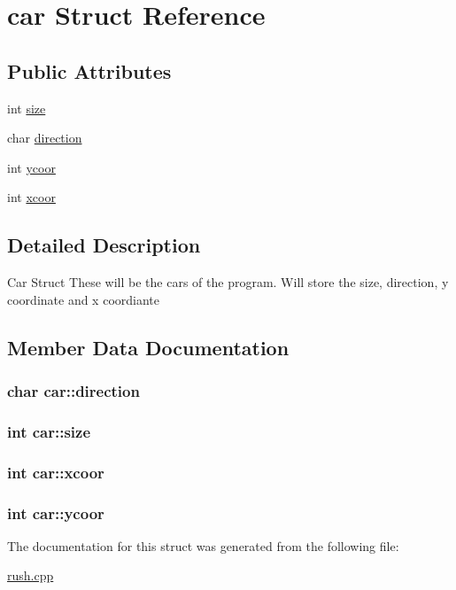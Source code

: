 \hypertarget{structcar}{\section{car Struct Reference}
\label{structcar}
}
\subsection*{Public Attributes}
\begin{DoxyCompactItemize}
\item 
int \hyperlink{structcar_a34bcb093579310a755e7e6ba5f34ceb5}{size}
\item 
char \hyperlink{structcar_aa51ed785bb8ae116eded5f04fcbbe47a}{direction}
\item 
int \hyperlink{structcar_a0eeb4b530a2d31e988d156cbb2e494bb}{ycoor}
\item 
int \hyperlink{structcar_a349ca3ec41d22e266dad88eea0386969}{xcoor}
\end{DoxyCompactItemize}


\subsection{Detailed Description}
Car Struct These will be the cars of the program. Will store the size, direction, y coordinate and x coordiante 

\subsection{Member Data Documentation}
\hypertarget{structcar_aa51ed785bb8ae116eded5f04fcbbe47a}{
\subsubsection[{direction}]{\setlength{\rightskip}{0pt plus 5cm}char car\+::direction}}\label{structcar_aa51ed785bb8ae116eded5f04fcbbe47a}
\hypertarget{structcar_a34bcb093579310a755e7e6ba5f34ceb5}{
\subsubsection[{size}]{\setlength{\rightskip}{0pt plus 5cm}int car\+::size}}\label{structcar_a34bcb093579310a755e7e6ba5f34ceb5}
\hypertarget{structcar_a349ca3ec41d22e266dad88eea0386969}{
\subsubsection[{xcoor}]{\setlength{\rightskip}{0pt plus 5cm}int car\+::xcoor}}\label{structcar_a349ca3ec41d22e266dad88eea0386969}
\hypertarget{structcar_a0eeb4b530a2d31e988d156cbb2e494bb}{
\subsubsection[{ycoor}]{\setlength{\rightskip}{0pt plus 5cm}int car\+::ycoor}}\label{structcar_a0eeb4b530a2d31e988d156cbb2e494bb}


The documentation for this struct was generated from the following file\+:\begin{DoxyCompactItemize}
\item 
\hyperlink{rush_8cpp}{rush.\+cpp}\end{DoxyCompactItemize}
